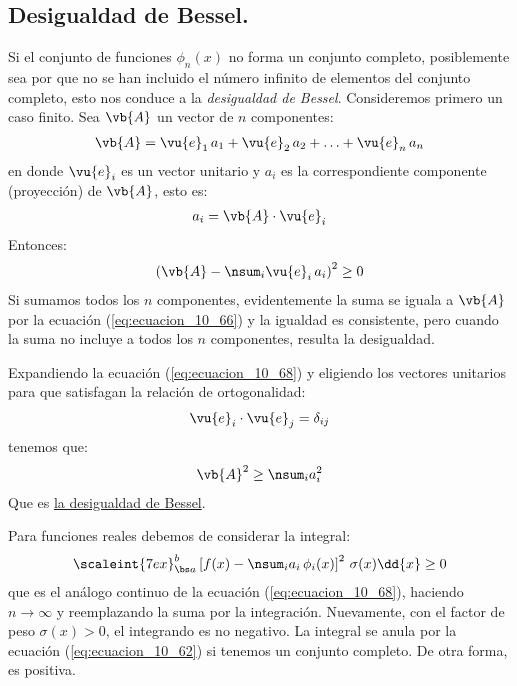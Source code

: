 \subsection{Desigualdad de Bessel.}

Si el conjunto de funciones $\phi_{n} (x)$ no forma un conjunto completo, posiblemente sea por que no se han incluido el número infinito de elementos del conjunto completo, esto nos conduce a la \emph{desigualdad de Bessel}. Consideremos primero un caso finito. Sea $\vb{A}$ un vector de $n$ componentes:
\begin{align}
\vb{A} = \vu{e}_{1} \, a_{1} + \vu{e}_{2} \, a_{2} + \ldots + \vu{e}_{n} \, a_{n} 
\label{eq:ecuacion_10_66}
\end{align}
en donde $\vu{e}_{i}$ es un vector unitario y $a_{i}$ es la correspondiente componente (proyección) de $\vb{A}$, esto es:
\begin{align}
a_{i} = \vb{A} \cdot \vu{e}_{i}
\label{eq:ecuacion_10_67}
\end{align}
Entonces:
\begin{align}
\left( \vb{A} - \nsum_{i} \vu{e}_{i} \, a_{i} \right)^{2} \geq 0
\label{eq:ecuacion_10_68}
 \end{align}
Si sumamos todos los $n$ componentes, evidentemente la suma se iguala a $\vb{A}$ por la ecuación (\ref{eq:ecuacion_10_66}) y la igualdad es consistente, pero cuando la suma no incluye a todos los $n$ componentes, resulta la desigualdad.
\par
Expandiendo la ecuación (\ref{eq:ecuacion_10_68}) y eligiendo los vectores unitarios para que satisfagan la relación de ortogonalidad:
\begin{align}
\vu{e}_{i} \cdot \vu{e}_{j} = \delta_{ij}
\label{eq:ecuacion_10_69}
\end{align}
tenemos que:
\begin{align}
\vb{A}^{2} \geq \nsum_{i} a_{i}^{2}
\label{eq:ecuacion_10_70}
\end{align}
Que es \underline{la desigualdad de Bessel}.
\par
Para funciones reales debemos de considerar la integral:
\begin{align}
\scaleint{7ex}_{\bs a}^{b} \left[ f (x) - \nsum_{i} a_{i} \, \phi_{i} (x) \right]^{2} \, \sigma (x) \dd{x} \geq 0
\label{eq:ecuacion_10_71}
\end{align}
que es el análogo continuo de la ecuación (\ref{eq:ecuacion_10_68}), haciendo $n \to \infty$ y reemplazando la suma por la integración. Nuevamente, con el factor de peso $\sigma (x) > 0 $, el integrando es no negativo. La integral se anula por la ecuación (\ref{eq:ecuacion_10_62}) si tenemos un conjunto completo. De otra forma, es positiva.

